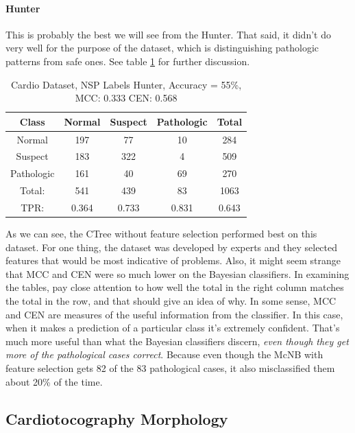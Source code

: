 \paragraph{Hunter}
This is probably the best we will see from the Hunter.  That said, it didn't do very well for the purpose of the dataset, which is distinguishing pathologic patterns from safe ones.  See table \ref{tab:cardioNSPHunter} for further discussion.

\begin{table}[h!]
	\centering
	\begin{tabular}{|c|c|c|c|c|}
		\hline
		Class&Normal&Suspect&Pathologic&Total\\\hline
Normal&197&77&10&284\\
Suspect&183&322&4&509\\
Pathologic&161&40&69&270\\\hline
Total:&541&439&83&1063\\
TPR:&0.364&0.733&0.831&0.643\\
		\hline
	\end{tabular}
	\caption[Cardiotocography NSP: Hunter Confusion Matrix]{Cardio Dataset, NSP Labels Hunter, Accuracy = 55\%, MCC: 0.333 CEN: 0.568}
	\label{tab:cardioNSPHunter}
\end{table}

As we can see, the CTree without feature selection performed best on this dataset.  For one thing, the dataset was developed by experts and they selected features that would be most indicative of problems.  Also, it might seem strange that MCC and CEN were so much lower on the Bayesian classifiers.  In examining the tables, pay close attention to how well the total in the right column matches the total in the row, and that should give an idea of why.  In some sense, MCC and CEN are measures of the useful information from the classifier.  In this case, when it makes a prediction of a particular class it's extremely confident.  That's much more useful than what the Bayesian classifiers discern, \textit{even though they get more of the pathological cases correct}.  Because even though the McNB with feature selection gets 82 of the 83 pathological cases, it also misclassified them about 20\% of the time. 
\subsection{Cardiotocography Morphology}
